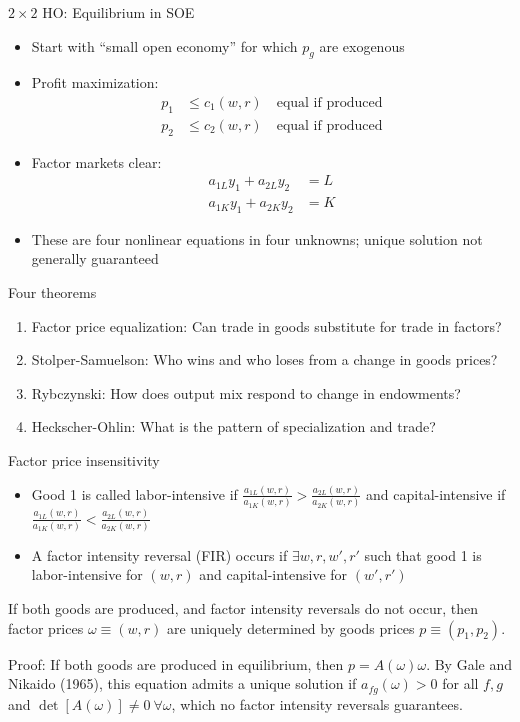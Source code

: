 \documentclass[11pt,notes=hide,aspectratio=169]{beamer}
\begin{document}
\begin{frame}{$2 \times 2$ HO: Equilibrium in SOE}
\begin{itemize}
	\item Start with ``small open economy'' for which $p_g$ are exogenous
	\item Profit maximization:
	\begin{align*}
	p_{1} &\leq c_{1}\left( w,r\right) \quad \text{equal if produced} \\
	p_{2} &\leq c_{2}\left( w,r\right) \quad \text{equal if produced} 
	\end{align*}
	\item Factor markets clear:
	\begin{align*}
	a_{1L}y_{1}+a_{2L}y_{2} &=L \\
	a_{1K}y_{1}+a_{2K}y_{2} &=K
	\end{align*}
	\item These are four nonlinear equations in four unknowns; unique solution not generally guaranteed
\end{itemize}
\end{frame}
\begin{frame}{Four theorems}
\begin{enumerate}
	\item Factor price equalization: Can trade in goods substitute for trade in factors?
	\item Stolper-Samuelson: Who wins and who loses from a change in goods prices?
	\item Rybczynski: How does output mix respond to change in endowments?
	\item Heckscher-Ohlin: What is the pattern of specialization and trade?
\end{enumerate}
\end{frame}
\begin{frame}{Factor price insensitivity}
\begin{itemize}
\item 
Good 1 is called labor-intensive if 
$\frac{a_{1L}\left(w,r\right)}{a_{1K}\left(w,r\right)}
>\frac{a_{2L}\left(w,r\right)}{a_{2K}\left(w,r\right)}$
and capital-intensive if 
$\frac{a_{1L}\left(w,r\right)}{a_{1K}\left(w,r\right)}
<\frac{a_{2L}\left(w,r\right)}{a_{2K}\left(w,r\right)}$
\item
A factor intensity reversal (FIR) occurs if $\exists w,r,w',r'$ such that good 1 is labor-intensive for $(w,r)$ and capital-intensive for $(w',r')$
\end{itemize}
\begin{lemma}
If both goods are produced, and factor intensity reversals do not occur,
then factor prices $\omega \equiv (w,r)$ are uniquely determined by goods prices $p \equiv (p_1,p_2)$.
\end{lemma}
Proof:
If both goods are produced in equilibrium, then $p = A(\omega) \omega$. By Gale and Nikaido (1965), this equation admits a unique solution if $a_{fg}(\omega)>0$ for all $f,g$ and $\det[A(\omega)]\neq 0\ \forall \omega$, which no factor intensity reversals guarantees.
\end{frame}
\end{document}

